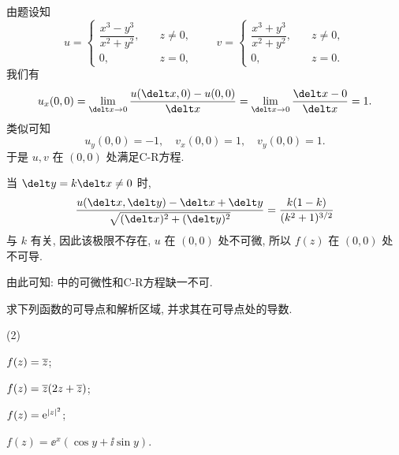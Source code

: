 \begin{solution}
  由题设知
  \[
    u=\begin{cases}
        \dfrac{x^3-y^3}{x^2+y^2},\quad &z\neq 0,\\
        0,&z=0,
      \end{cases}\qquad
    v=\begin{cases}
        \dfrac{x^3+y^3}{x^2+y^2},\quad &z\neq 0,\\
        0,&z=0.
      \end{cases}
  \]
  我们有
  \[
     u_x(0,0)
    =\lim_{\delt x\ra 0}\frac{u(\delt x,0)-u(0,0)}{\delt x}
    =\lim_{\delt x\ra 0}\frac{\delt x-0}{\delt x}=1.
  \]
  类似可知
  \[
    u_y(0,0)=-1,\quad
    v_x(0,0)=1,\quad
    v_y(0,0)=1.
  \]
  于是 $u,v$ 在 $(0,0)$ 处满足C-R方程.

  当 $\delt y=k\delt x\neq 0$ 时,
  \[
     \frac{u(\delt x,\delt y)-\delt x+\delt y}{\sqrt{(\delt x)^2+(\delt y)^2}}
    =\frac{k(1-k)}{(k^2+1)^{3/2}}
  \]
  与 $k$ 有关, 因此该极限不存在, $u$ 在 $(0,0)$ 处不可微, 所以 $f(z)$ 在 $(0,0)$ 处不可导.
\end{solution}

由此可知: \alert{\thmCR 中的可微性和C-R方程缺一不可.}

\begin{example}
  求下列函数的可导点和解析区域, 并求其在可导点处的导数.
  \begin{subexample}(2)
    \item $f(z)=\overline z$;
    \item $f(z)=\overline z(2z+\overline z)$;
    \item $f(z)=\mathrm{e}^{\lvert z\rvert^2}$;
    \item $f(z)=\ee^x(\cos y+\ii\sin y)$.
    \label{enum:exp}
  \end{subexample}
\end{example}

